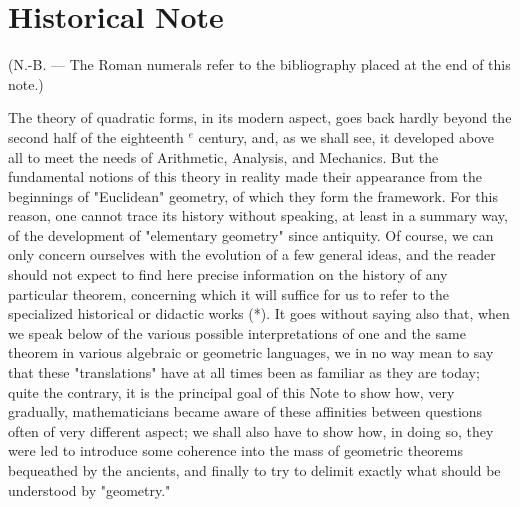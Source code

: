 \backmatter
\chapter*{Historical Note}
{}

(N.-B. --- The Roman numerals refer to the bibliography placed at the end of this note.)

The theory of quadratic forms, in its modern aspect, goes back hardly beyond the second half of the eighteenth \(^{e}\) century, and, as we shall see, it developed above all to meet the needs of Arithmetic, Analysis, and Mechanics. But the fundamental notions of this theory in reality made their appearance from the beginnings of "Euclidean" geometry, of which they form the framework. For this reason, one cannot trace its history without speaking, at least in a summary way, of the development of "elementary geometry" since antiquity. Of course, we can only concern ourselves with the evolution of a few general ideas, and the reader should not expect to find here precise information on the history of any particular theorem, concerning which it will suffice for us to refer to the specialized historical or didactic works (*). It goes without saying also that, when we speak below of the various possible interpretations of one and the same theorem in various algebraic or geometric languages, we in no way mean to say that these "translations" have at all times been as familiar as they are today; quite the contrary, it is the principal goal of this Note to show how, very gradually, mathematicians became aware of these affinities between questions often of very different aspect; we shall also have to show how, in doing so, they were led to introduce some coherence into the mass of geometric theorems bequeathed by the ancients, and finally to try to delimit exactly what should be understood by "geometry."

